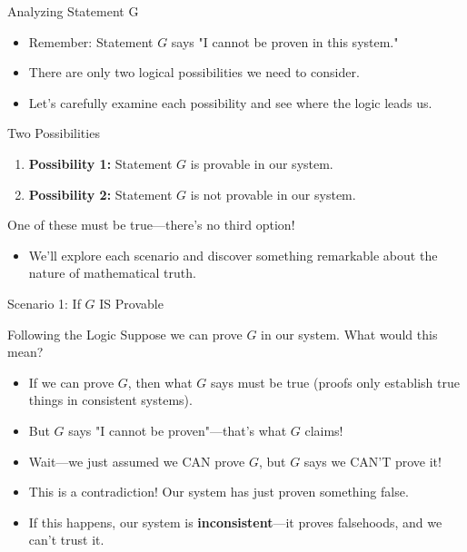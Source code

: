 \documentclass[aspectratio=169]{beamer}
\begin{document}
\begin{frame}{Analyzing Statement G}

\begin{itemize}
    \item Remember: Statement $G$ says "I cannot be proven in this system."
    \item There are only two logical possibilities we need to consider.
    \item Let's carefully examine each possibility and see where the logic leads us.
\end{itemize}

\begin{block}{Two Possibilities}
\begin{enumerate}
    \item \textbf{Possibility 1:} Statement $G$ is provable in our system.
    \item \textbf{Possibility 2:} Statement $G$ is not provable in our system.
\end{enumerate}
One of these must be true—there's no third option!
\end{block}

\begin{itemize}
    \item We'll explore each scenario and discover something remarkable about the nature of mathematical truth.
\end{itemize}

\end{frame}

\begin{frame}{Scenario 1: If $G$ IS Provable}

\begin{alertblock}{Following the Logic}
Suppose we can prove $G$ in our system. What would this mean?
\end{alertblock}

\begin{itemize}
    \item If we can prove $G$, then what $G$ says must be true (proofs only establish true things in consistent systems).
    \item But $G$ says "I cannot be proven"—that's what $G$ claims!
    \item Wait—we just assumed we CAN prove $G$, but $G$ says we CAN'T prove it!
    \item This is a contradiction! Our system has just proven something false.
    \item If this happens, our system is \textbf{inconsistent}—it proves falsehoods, and we can't trust it.
\end{itemize}

\end{frame}
\end{document}
